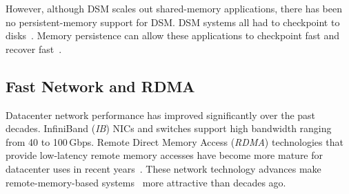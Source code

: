 \documentclass[sigconf]{acmart}
\renewcommand{\em}{\it}
\newcommand{\gbps}{\,Gbps}
\newcommand{\nvm}{PM}
\newcommand{\ib}{IB}
\providecommand{\DIFdelbegin}{} %
\providecommand{\DIFdelend}{} %
\begin{document}
However, although DSM scales out shared-memory applications, 
there has been no persistent-memory support for DSM.
DSM systems all had to checkpoint to disks~\cite{Stumm90,Richard93,Neves94}.
Memory persistence
can allow these applications to checkpoint fast and recover fast~\cite{Narayanan12-ASPLOS}.

\DIFdelbegin %
\DIFdelend \subsection{Fast Network and RDMA}
\DIFdelbegin %
\DIFdelend Datacenter network performance has improved significantly over the past decades.
InfiniBand ({\em \ib}) NICs and switches support high bandwidth ranging from 40 to 100\gbps.
Remote Direct Memory Access ({\em RDMA}) technologies that provide low-latency remote memory accesses
have become more mature for datacenter uses in recent years~\cite{FaSST,Dragojevic14-NSDI,Kalia14-SIGCOMM,Guo16-SIGCOMM}.
These network technology advances
make remote-memory-based systems~\cite{Nelson15-ATC,GU17-NSDI,OSDI-Disaggregate,Chen16-EUROSYS,Binnig16-VLDB,Zamanian17-VLDB} more attractive than decades ago.
\end{document}
